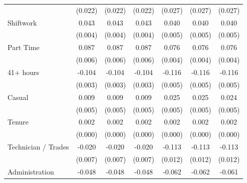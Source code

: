 {\begin{tabular}{l*{6}{c}}
                    &     (0.022)         &     (0.022)         &     (0.022)         &     (0.027)         &     (0.027)         &     (0.027)         \\
Shiftwork           &       0.043\sym{***}&       0.043\sym{***}&       0.043\sym{***}&       0.040\sym{***}&       0.040\sym{***}&       0.040\sym{***}\\
                    &     (0.004)         &     (0.004)         &     (0.004)         &     (0.005)         &     (0.005)         &     (0.005)         \\
Part Time           &       0.087\sym{***}&       0.087\sym{***}&       0.087\sym{***}&       0.076\sym{***}&       0.076\sym{***}&       0.076\sym{***}\\
                    &     (0.006)         &     (0.006)         &     (0.006)         &     (0.004)         &     (0.004)         &     (0.004)         \\
41+ hours           &      -0.104\sym{***}&      -0.104\sym{***}&      -0.104\sym{***}&      -0.116\sym{***}&      -0.116\sym{***}&      -0.116\sym{***}\\
                    &     (0.003)         &     (0.003)         &     (0.003)         &     (0.005)         &     (0.005)         &     (0.005)         \\
Casual              &       0.009\sym{*}  &       0.009\sym{*}  &       0.009\sym{*}  &       0.025\sym{***}&       0.025\sym{***}&       0.024\sym{***}\\
                    &     (0.005)         &     (0.005)         &     (0.005)         &     (0.005)         &     (0.005)         &     (0.005)         \\
Tenure              &       0.002\sym{***}&       0.002\sym{***}&       0.002\sym{***}&       0.002\sym{***}&       0.002\sym{***}&       0.002\sym{***}\\
                    &     (0.000)         &     (0.000)         &     (0.000)         &     (0.000)         &     (0.000)         &     (0.000)         \\
Technician / Trades &      -0.020\sym{***}&      -0.020\sym{***}&      -0.020\sym{***}&      -0.113\sym{***}&      -0.113\sym{***}&      -0.113\sym{***}\\
                    &     (0.007)         &     (0.007)         &     (0.007)         &     (0.012)         &     (0.012)         &     (0.012)         \\
Administration      &      -0.048\sym{***}&      -0.048\sym{***}&      -0.048\sym{***}&      -0.062\sym{***}&      -0.062\sym{***}&      -0.061\sym{***}\\

\end{tabular}}
